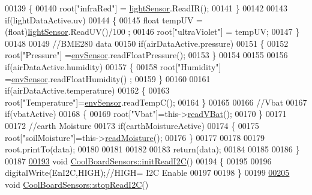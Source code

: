 \begin{DoxyCode}
00139     \{
00140         root[\textcolor{stringliteral}{"infraRed"}] = \hyperlink{class_cool_board_sensors_a3e397300fb707dd193e909a757bf6102}{lightSensor}.ReadIR();
00141     \}
00142 
00143     \textcolor{keywordflow}{if}(lightDataActive.uv)
00144     \{
00145         \textcolor{keywordtype}{float} tempUV = (float)\hyperlink{class_cool_board_sensors_a3e397300fb707dd193e909a757bf6102}{lightSensor}.ReadUV()/100 ;
00146         root[\textcolor{stringliteral}{"ultraViolet"}] = tempUV;
00147     \}
00148     
00149     \textcolor{comment}{//BME280 data}
00150     \textcolor{keywordflow}{if}(airDataActive.pressure)  
00151     \{
00152         root[\textcolor{stringliteral}{"Pressure"}] =\hyperlink{class_cool_board_sensors_a868e38985e9a2412829fa2790ca13e2e}{envSensor}.readFloatPressure();
00153     \}
00154     
00155         
00156     \textcolor{keywordflow}{if}(airDataActive.humidity)  
00157     \{   
00158         root[\textcolor{stringliteral}{"Humidity"}] =\hyperlink{class_cool_board_sensors_a868e38985e9a2412829fa2790ca13e2e}{envSensor}.readFloatHumidity() ;
00159     \}   
00160     
00161     \textcolor{keywordflow}{if}(airDataActive.temperature)
00162     \{
00163         root[\textcolor{stringliteral}{"Temperature"}]=\hyperlink{class_cool_board_sensors_a868e38985e9a2412829fa2790ca13e2e}{envSensor}.readTempC();
00164     \}
00165     
00166     \textcolor{comment}{//Vbat}
00167     \textcolor{keywordflow}{if}(vbatActive)  
00168     \{   
00169         root[\textcolor{stringliteral}{"Vbat"}]=this->\hyperlink{class_cool_board_sensors_a6944b6ea7bce8e2fce1b434acfd9d5f3}{readVBat}();
00170     \}
00171     
00172     \textcolor{comment}{//earth Moisture}
00173     \textcolor{keywordflow}{if}(earthMoistureActive)
00174     \{   
00175         root[\textcolor{stringliteral}{"soilMoisture"}]=this->\hyperlink{class_cool_board_sensors_a8761bff50373c485f4465c8db47d0633}{readMoisture}();
00176     \}
00177     
00178     
00179     root.printTo(data);
00180     
00181 
00182 
00183     \textcolor{keywordflow}{return}(data);
00184     
00185 
00186 \}
00187 
\hyperlink{class_cool_board_sensors_acad6a8418c66d36868caca23c844ecb6}{00193} \textcolor{keywordtype}{void} \hyperlink{class_cool_board_sensors_acad6a8418c66d36868caca23c844ecb6}{CoolBoardSensors::initReadI2C}()
00194 \{
00195   
00196     digitalWrite(EnI2C,HIGH);\textcolor{comment}{//HIGH= I2C Enable}
00197 
00198 \}
00199 
\hyperlink{class_cool_board_sensors_ab67b900b9e5e7c18d52d2d9107ba171b}{00205} \textcolor{keywordtype}{void} \hyperlink{class_cool_board_sensors_ab67b900b9e5e7c18d52d2d9107ba171b}{CoolBoardSensors::stopReadI2C}()

\end{DoxyCode}
